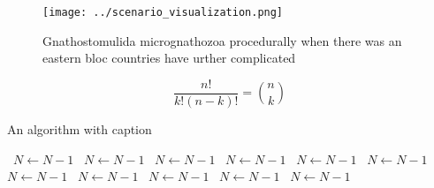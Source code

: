 \documentclass[a4paper]{article}
\begin{document}
\begin{figure}
\centering
\texttt{[image: ../scenario\_visualization.png]}
\caption{Gnathostomulida micrognathozoa procedurally when there was an eastern bloc countries have urther complicated 
}
\end{figure}
 
\[ \frac{n!}{k!(n-k)!} = \binom{n}{k} \]

\begin{algorithm}
\caption{An algorithm with caption}
\begin{algorithmic}
\    \State $N \gets N - 1$
\    \State $N \gets N - 1$
\    \State $N \gets N - 1$
\    \State $N \gets N - 1$
\    \State $N \gets N - 1$
\    \State $N \gets N - 1$
\    \State $N \gets N - 1$
\    \State $N \gets N - 1$
\    \State $N \gets N - 1$
\    \State $N \gets N - 1$
\    \State $N \gets N - 1$
\EndWhile
\end{algorithmic}
\end{algorithm}
\end{document}
